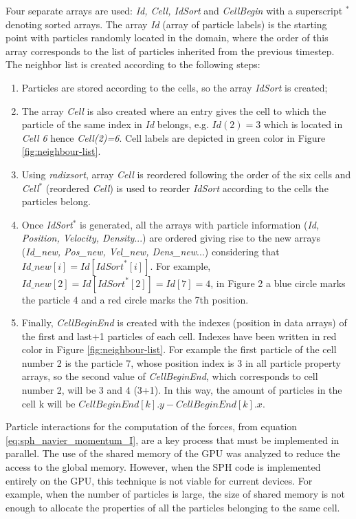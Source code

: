 Four separate arrays are used: \textit{Id, Cell, IdSort} and \textit{CellBegin} with a superscript $^*$ denoting sorted arrays. The array \textit{Id} (array of particle labels) is the starting point with particles randomly located in the domain, where the order of this array corresponds to the list of particles inherited from the previous timestep. The neighbor list is created according to the following steps:
%
\begin{enumerate}
\item Particles are stored according to the cells, so the array \textit{IdSort} is created;
\item The array \textit{Cell} is also created where an entry gives the cell to which the particle of the same index in \textit{Id} belongs, e.g. $\textit{Id}(2) = 3$ which is located in \textit{Cell 6} hence \textit{Cell(2)=6}. Cell labels are depicted in green color in Figure \ref{fig:neighbour-list}.
\item Using \textit{radixsort}, array \textit{Cell} is reordered following the order of the six cells and \textit{Cell}$^*$ (reordered \textit{Cell}) is used to reorder \textit{IdSort} according to the cells the particles belong.
\item Once \textit{IdSort}$^*$ is generated, all the arrays with particle information (\textit{Id, Position, Velocity, Density}...) are ordered giving rise to the new arrays (\textit{Id\_new, Pos\_new, Vel\_new, Dens\_new}...) considering that $\textit{Id\_new} [i] = \textit{Id} [ \textit{IdSort}^* [i] ]$. For example, $\textit{Id\_new} [2] = \textit{Id} [\textit{IdSort}^* [2] ] = \textit{Id} [7]=4$, in Figure 2 a blue circle marks the particle 4 and a red circle marks the 7th position.
\item Finally, \textit{CellBeginEnd} is created with the indexes (position in data arrays) of the first and last+1 particles of each cell. Indexes have been written in red color in Figure \ref{fig:neighbour-list}. For example the first particle of the cell number 2 is the particle 7, whose position index is 3 in all particle property arrays, so the second value of \textit{CellBeginEnd}, which corresponds to cell number 2, will be 3 and 4 (3+1). In this way, the amount of particles in the cell k will be $\textit{CellBeginEnd}[k].y-\textit{CellBeginEnd}[k].x$.
\end{enumerate}
%
Particle interactions for the computation of the forces, from equation \eqref{eq:sph_navier_momentum_I}, are a key process that must be implemented in parallel. The use of the shared memory of the \ac{GPU} was analyzed to reduce the access to the global memory. However, when the \ac{SPH} code is implemented entirely on the \ac{GPU}, this technique is not viable for current devices. For example, when the number of particles is large, the size of shared memory is not enough to allocate the properties of all the particles belonging to the same cell. 

